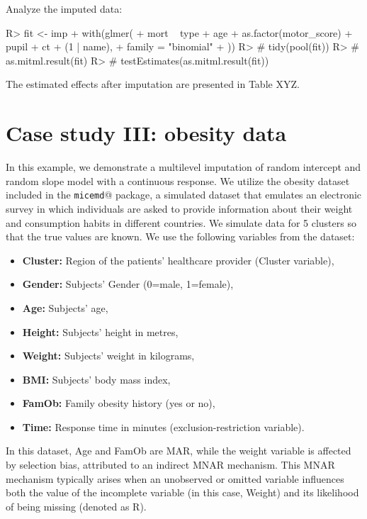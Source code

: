 \documentclass[
]{jss}
\providecommand{\tightlist}{%
  \setlength{\itemsep}{0pt}\setlength{\parskip}{0pt}}
\begin{document}
Analyze the imputed data:

\begin{CodeChunk}
\begin{CodeInput}
R> fit <- imp %
+   with(glmer(
+     mort ~ type + age + as.factor(motor_score) + pupil + ct + (1 | name),
+     family = "binomial"
+     )) 
R> # tidy(pool(fit))
R> # as.mitml.result(fit)
R> # testEstimates(as.mitml.result(fit))
\end{CodeInput}
\end{CodeChunk}

The estimated effects after imputation are presented in Table XYZ.

\hypertarget{case-study-iii-obesity-data}{%
\section{Case study III: obesity
data}\label{case-study-iii-obesity-data}}

In this example, we demonstrate a multilevel imputation of random
intercept and random slope model with a continuous response. We utilize
the obesity dataset included in the \texttt{micemd}@ package, a
simulated dataset that emulates an electronic survey in which
individuals are asked to provide information about their weight and
consumption habits in different countries. We simulate data for 5
clusters so that the true values are known. We use the following
variables from the dataset:

\begin{itemize}
\tightlist
\item
  \textbf{Cluster:} Region of the patients' healthcare provider (Cluster
  variable),
\item
  \textbf{Gender:} Subjects' Gender (0=male, 1=female),
\item
  \textbf{Age:} Subjects' age,
\item
  \textbf{Height:} Subjects' height in metres,
\item
  \textbf{Weight:} Subjects' weight in kilograms,
\item
  \textbf{BMI:} Subjects' body mass index,
\item
  \textbf{FamOb:} Family obesity history (yes or no),
\item
  \textbf{Time:} Response time in minutes (exclusion-restriction
  variable).
\end{itemize}

In this dataset, Age and FamOb are MAR, while the weight variable is
affected by selection bias, attributed to an indirect MNAR mechanism.
This MNAR mechanism typically arises when an unobserved or omitted
variable influences both the value of the incomplete variable (in this
case, Weight) and its likelihood of being missing (denoted as R).
\end{document}
